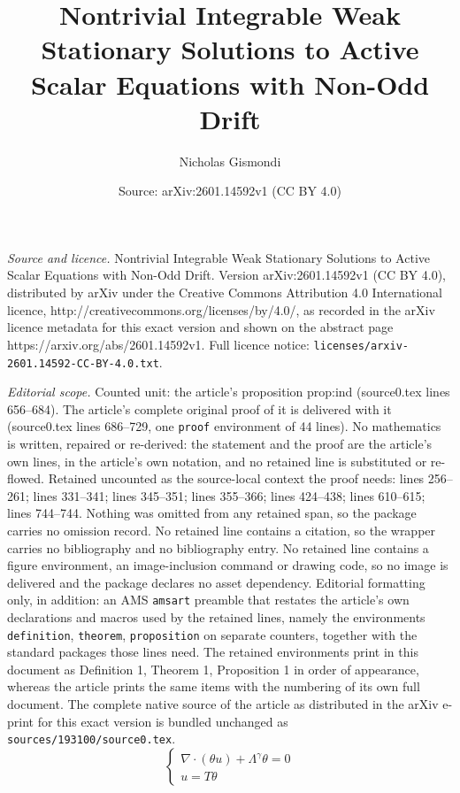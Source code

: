 \documentclass[10pt,a4paper]{amsart}
\title{Nontrivial Integrable Weak Stationary Solutions to Active Scalar Equations with Non-Odd Drift}
\author{Nicholas Gismondi}
\date{Source: arXiv:2601.14592v1 (CC BY 4.0)}
\begin{document}
\maketitle

\noindent\emph{Source and licence.} Nontrivial Integrable Weak Stationary Solutions to Active Scalar Equations with Non-Odd Drift. Version arXiv:2601.14592v1 (CC BY 4.0), distributed by arXiv under the Creative Commons Attribution 4.0 International licence, http://creativecommons.org/licenses/by/4.0/, as recorded in the arXiv licence metadata for this exact version and shown on the abstract page https://arxiv.org/abs/2601.14592v1. Full licence notice: \texttt{licenses/arxiv-2601.14592-CC-BY-4.0.txt}.\par\smallskip

\noindent\textit{Editorial scope.} Counted unit: the article's proposition prop:ind (source0.tex lines 656--684). The article's complete original proof of it is delivered with it (source0.tex lines 686--729, one \texttt{proof} environment of 44 lines). No mathematics is written, repaired or re-derived: the statement and the proof are the article's own lines, in the article's own notation, and no retained line is substituted or re-flowed.  Retained uncounted as the source-local context the proof needs: lines 256--261; lines 331--341; lines 345--351; lines 355--366; lines 424--438; lines 610--615; lines 744--744.  Nothing was omitted from any retained span, so the package carries no omission record.  No retained line contains a citation, so the wrapper carries no bibliography and no bibliography entry.  No retained line contains a figure environment, an image-inclusion command or drawing code, so no image is delivered and the package declares no asset dependency.  Editorial formatting only, in addition: an AMS \texttt{amsart} preamble that restates the article's own declarations and macros used by the retained lines, namely the environments \texttt{definition}, \texttt{theorem}, \texttt{proposition} on separate counters, together with the standard packages those lines need.  The retained environments print in this document as Definition 1, Theorem 1, Proposition 1 in order of appearance, whereas the article prints the same items with the numbering of its own full document.  The complete native source of the article as distributed in the arXiv e-print for this exact version is bundled unchanged as \texttt{sources/193100/source0.tex}.
\begin{equation}\label{eq:stat_eqn}
\begin{cases}
    \nabla \cdot (\theta u) + \Lambda^\gamma \theta = 0\\
    u = T\theta
\end{cases}
\end{equation}
\end{document}
